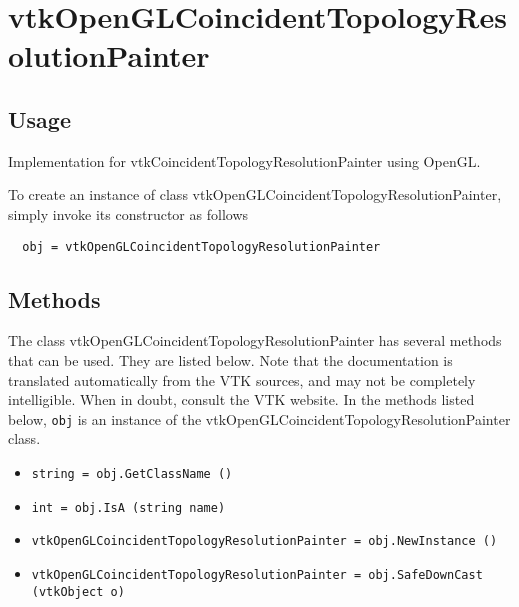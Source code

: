 \section{vtkOpenGLCoincidentTopologyResolutionPainter}

\subsection{Usage}

 Implementation for vtkCoincidentTopologyResolutionPainter using OpenGL.

To create an instance of class vtkOpenGLCoincidentTopologyResolutionPainter, simply
invoke its constructor as follows
\begin{verbatim}
  obj = vtkOpenGLCoincidentTopologyResolutionPainter
\end{verbatim}
\subsection{Methods}

The class vtkOpenGLCoincidentTopologyResolutionPainter has several methods that can be used.
  They are listed below.
Note that the documentation is translated automatically from the VTK sources,
and may not be completely intelligible.  When in doubt, consult the VTK website.
In the methods listed below, \verb|obj| is an instance of the vtkOpenGLCoincidentTopologyResolutionPainter class.
\begin{itemize}
\item  \verb|string = obj.GetClassName ()|

\item  \verb|int = obj.IsA (string name)|

\item  \verb|vtkOpenGLCoincidentTopologyResolutionPainter = obj.NewInstance ()|

\item  \verb|vtkOpenGLCoincidentTopologyResolutionPainter = obj.SafeDownCast (vtkObject o)|

\end{itemize}

